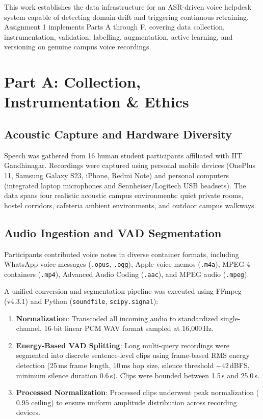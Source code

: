 \documentclass[10pt,a4paper,twocolumn]{article}
\renewcommand{\_}{\origunderscore\hspace{0pt}}
\begin{document}
This work establishes the data infrastructure for an ASR-driven voice helpdesk system capable of detecting domain drift and triggering continuous retraining. Assignment 1 implements Parts A through F, covering data collection, instrumentation, validation, labelling, augmentation, active learning, and versioning on genuine campus voice recordings.

\section{Part A: Collection, Instrumentation \& Ethics}

\subsection{Acoustic Capture and Hardware Diversity}
Speech was gathered from 16 human student participants affiliated with IIT Gandhinagar. Recordings were captured using personal mobile devices (OnePlus 11, Samsung Galaxy S23, iPhone, Redmi Note) and personal computers (integrated laptop microphones and Sennheiser/Logitech USB headsets). The data spans four realistic acoustic campus environments: quiet private rooms, hostel corridors, cafeteria ambient environments, and outdoor campus walkways.

\subsection{Audio Ingestion and VAD Segmentation}
Participants contributed voice notes in diverse container formats, including WhatsApp voice messages (\texttt{.opus}, \texttt{.ogg}), Apple voice memos (\texttt{.m4a}), MPEG-4 containers (\texttt{.mp4}), Advanced Audio Coding (\texttt{.aac}), and MPEG audio (\texttt{.mpeg}).

A unified conversion and segmentation pipeline was executed using FFmpeg (v4.3.1) and Python (\texttt{soundfile}, \texttt{scipy.signal}):
\begin{enumerate}
    \item \textbf{Normalization}: Transcoded all incoming audio to standardized single-channel, 16-bit linear PCM WAV format sampled at 16,000\,Hz.
    \item \textbf{Energy-Based VAD Splitting}: Long multi-query recordings were segmented into discrete sentence-level clips using frame-based RMS energy detection (25\,ms frame length, 10\,ms hop size, silence threshold $-42$\,dBFS, minimum silence duration 0.6\,s). Clips were bounded between 1.5\,s and 25.0\,s.
    \item \textbf{Processed Normalization}: Processed clips underwent peak normalization ($0.95$ ceiling) to ensure uniform amplitude distribution across recording devices.
\end{enumerate}
\end{document}
